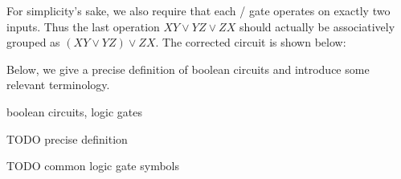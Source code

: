 {  For simplicity's sake, we also require that each \AND/\OR{} gate operates on
  exactly two inputs.  Thus the last \OR{} operation \(XY∨YZ∨ZX\) should
  actually be associatively grouped as \((XY∨YZ)∨ZX\).  The corrected circuit
  is shown below:

  \begin{center}
  \end{center}

}


Below, we give a precise definition of boolean circuits and introduce some
relevant terminology.

\begin{definition}{boolean circuits, logic gates}{}

  TODO precise definition

  TODO common logic gate symbols

\end{definition}



